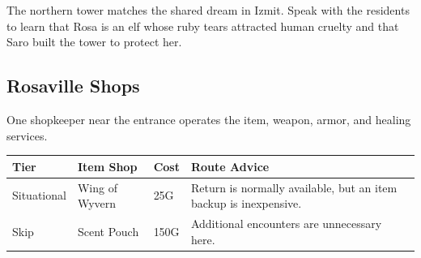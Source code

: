 \documentclass[
  american,
  10pt,
  letterpaper,
  oneside,
  open=any]{scrreprt}
\newcounter{none} %
\newenvironment{guidetable}{%
  \small\setstretch{1.0}%
  \setlength{\tabcolsep}{4pt}%
  \setlength{\LTpre}{8pt}\setlength{\LTpost}{10pt}%
  \renewcommand{\arraystretch}{1.16}%
}{ }
\begin{document}
The northern tower matches the shared dream in Izmit. Speak with the
residents to learn that Rosa is an elf whose ruby tears attracted human
cruelty and that Saro built the tower to protect her.

\subsection{Rosaville Shops}\label{rosaville-shops}

One shopkeeper near the entrance operates the item, weapon, armor, and
healing services.

\begin{guidetable}

{\def\LTcaptype{none} %
\begin{longtable}[]{@{}
  >{\raggedright\arraybackslash}p{}
  >{\raggedright\arraybackslash}p{}
  >{\raggedleft\arraybackslash}p{}
  >{\raggedright\arraybackslash}p{}@{}}
\toprule\noalign{}
\begin{minipage}[b]{\linewidth}\raggedright
\color{GuideGreen}\bfseries Tier
\end{minipage} & \begin{minipage}[b]{\linewidth}\raggedright
\color{GuideGreen}\bfseries Item Shop
\end{minipage} & \begin{minipage}[b]{\linewidth}\raggedleft
\color{GuideGreen}\bfseries Cost
\end{minipage} & \begin{minipage}[b]{\linewidth}\raggedright
\color{GuideGreen}\bfseries Route Advice
\end{minipage} \\
\midrule\noalign{}
\endhead
\bottomrule\noalign{}
\endlastfoot
Situational & Wing of Wyvern & 25G & Return is normally available, but
an item backup is inexpensive. \\
Skip & Scent Pouch & 150G & Additional encounters are unnecessary
here. \\
\end{longtable}
}

\end{guidetable}
\end{document}
